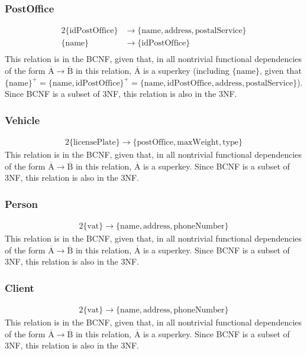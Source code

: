 \documentclass{report}[a4paper]
\theoremstyle{remark}
\begin{document}
\subsubsection{PostOffice}
\begin{alignat*}{2}
    \{\text{idPostOffice}\} &\rightarrow \{\text{name},\text{address},\text{postalService}\} \\
    \{\text{name}\} &\rightarrow \{\text{idPostOffice}\} \\
\end{alignat*}
This relation is in the BCNF, given that, in all nontrivial functional dependencies of the form $\overline{\text{A}} \rightarrow \overline{\text{B}}$ in this relation, $\overline{\text{A}}$ is a superkey (including $\{\text{name}\}$, given that $\{\text{name}\}^+ = \{\text{name}, \text{idPostOffice}\}^+ = \{\text{name}, \text{idPostOffice}, \text{address}, \text{postalService}\}$). Since BCNF is a subset of 3NF, this relation is also in the 3NF.
\subsubsection{Vehicle}
\begin{alignat*}{2}
    \{\text{licensePlate}\} \rightarrow \{\text{postOffice},\text{maxWeight},\text{type}\}
\end{alignat*}
This relation is in the BCNF, given that, in all nontrivial functional dependencies of the form $\overline{\text{A}} \rightarrow \overline{\text{B}}$ in this relation, $\overline{\text{A}}$ is a superkey. Since BCNF is a subset of 3NF, this relation is also in the 3NF.
\subsubsection{Person}
\begin{alignat*}{2}
    \{\text{vat}\} \rightarrow \{\text{name},\text{address},\text{phoneNumber}\}
\end{alignat*}
This relation is in the BCNF, given that, in all nontrivial functional dependencies of the form $\overline{\text{A}} \rightarrow \overline{\text{B}}$ in this relation, $\overline{\text{A}}$ is a superkey. Since BCNF is a subset of 3NF, this relation is also in the 3NF.
\subsubsection{Client}
\begin{alignat*}{2}
    \{\text{vat}\} \rightarrow \{\text{name},\text{address},\text{phoneNumber}\}
\end{alignat*}
This relation is in the BCNF, given that, in all nontrivial functional dependencies of the form $\overline{\text{A}} \rightarrow \overline{\text{B}}$ in this relation, $\overline{\text{A}}$ is a superkey. Since BCNF is a subset of 3NF, this relation is also in the 3NF.
\end{document}
